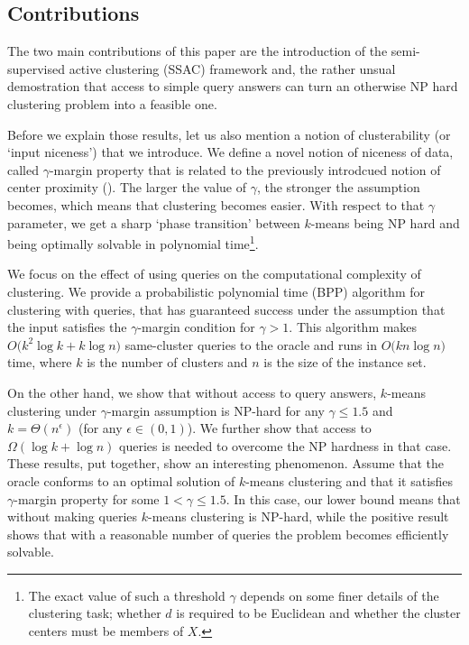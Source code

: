 \documentclass{article}
\begin{document}
\subsection{Contributions}
The two main contributions of this paper are the introduction of the semi-supervised active clustering (SSAC) framework and, the rather unsual 
demostration that access to simple query answers can turn an otherwise NP hard clustering problem into a feasible one. 

Before we explain those results, let us also mention a notion of clusterability (or `input niceness') that we introduce. We define a novel notion of niceness of data, called $\gamma$-margin property that is related to the previously introdcued notion of center proximity (\cite{awasthi2012center}). The larger the value of $\gamma$, the stronger the assumption becomes, which means that clustering becomes easier. With respect to that $\gamma$ parameter, we get a sharp `phase transition' between $k$-means being NP hard and being optimally solvable in polynomial time\footnote{The exact value of such a threshold $\gamma$ depends on some finer details of the clustering task; whether $d$ is required to be Euclidean and whether the cluster centers must be members of $X$.}.

We focus on the effect of using queries on the computational complexity of clustering. We provide a probabilistic polynomial time (BPP) algorithm for clustering with queries, that has guaranteed success under the assumption that the input satisfies the $\gamma$-margin condition for $\gamma > 1$. This algorithm makes $O\big(k^2\log k + k\log n)$ same-cluster queries to the oracle and runs in $O\big(kn\log n)$ time, where $k$ is the number of clusters and $n$ is the size of the instance set.

On the other hand, we show that without access to query answers, $k$-means clustering under $\gamma$-margin assumption is NP-hard for any $\gamma \leq 1.5$ and $k=\Theta(n^\epsilon)$ (for any $\epsilon\in (0,1)$). We further show that access to $\Omega(\log k + \log n)$ queries is needed to overcome the NP hardness in that case.
These results, put together, show an interesting phenomenon. Assume that the oracle conforms to an optimal solution of $k$-means clustering and that it satisfies $\gamma$-margin property for some $1<\gamma \leq 1.5$. In this case, our lower bound means that without making queries $k$-means clustering is NP-hard, while the positive result shows that with a reasonable number of queries the problem becomes efficiently solvable.  
\end{document}
